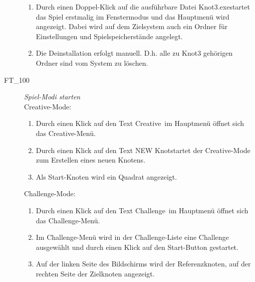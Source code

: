 \begin{description}
\begin{enumerate}
		\item Durch einen Doppel-Klick auf die ausführbare Datei \glqq Knot3.exe\grqq startet das Spiel erstmalig im Fenstermodus und das Hauptmenü wird angezeigt. Dabei wird auf dem Zielsystem auch ein Ordner für Einstellungen und Spielspeicherstände angelegt.
		
		\item Die Deinstallation erfolgt manuell. D.h. alle zu Knot3 gehörigen Ordner sind vom System zu löschen.
		~\\ 
	
	\end{enumerate}
	
	

\label{FT:100}
	
	\item[FT\_100] \textit{Spiel-Modi starten} \hfill\\
	
	Creative-Mode:\\
	
	\begin{enumerate}
	
		\item Durch einen Klick auf den Text \glqq Creative\grqq~im Hauptmenü öffnet sich das Creative-Menü.
		
		\item Durch einen Klick auf den Text \glqq NEW Knot\glqq startet der Creative-Mode zum Erstellen eines neuen Knotens.
		
		\item Als Start-Knoten wird ein Quadrat angezeigt.\\
	
	\end{enumerate}
	
	Challenge-Mode:\\
	
	\begin{enumerate}
	
		\item Durch einen Klick auf den Text \glqq Challenge\grqq~im Hauptmenü öffnet sich das Challenge-Menü.
		
		\item Im Challenge-Menü wird in der Challenge-Liste eine Challenge ausgewählt und durch einen Klick auf den Start-Button gestartet.
		
		\item Auf der linken Seite des Bildschirms wird der Referenzknoten, auf der rechten Seite der Zielknoten angezeigt.
	
	\end{enumerate}
	~\\

	
\end{description}









